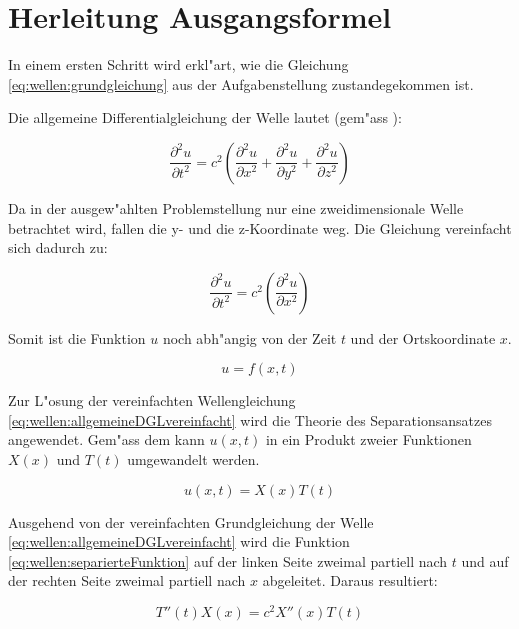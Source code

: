 \section{Herleitung Ausgangsformel}
In einem ersten Schritt wird erkl"art, wie die 
Gleichung \ref{eq:wellen:grundgleichung} aus der Aufgabenstellung 
zustandegekommen 
ist.

Die allgemeine Differentialgleichung der Welle lautet (gem"ass 
\cite{wellen:smirnow2}):

\begin{equation*}
	\frac{\partial^2 u}{\partial t^2}
	=
	c^2
	\left(
		\frac{\partial^2 u}{\partial x^2} 
		+ \frac{\partial^2 u}{\partial y^2} 
		+ \frac{\partial^2 u}{\partial z^2}
	\right)
	\label{eq:wellen:allgemeineDGL}
\end{equation*}

Da in der ausgew"ahlten Problemstellung nur eine zweidimensionale Welle 
betrachtet wird, fallen die y- und die z-Koordinate weg. Die Gleichung 
vereinfacht sich dadurch zu:

\begin{equation}
	\frac{\partial^2 u}{\partial t^2}
	=
	c^2
	\left(
		\frac{\partial^2 u}{\partial x^2} 
	\right)
	\label{eq:wellen:allgemeineDGLvereinfacht}
\end{equation}

Somit ist die Funktion $u$ noch abh"angig von der Zeit $t$ und der 
Ortskoordinate 
$x$.

\begin{equation*}
	u = f(x,t)
\end{equation*}

Zur L"osung der vereinfachten Wellengleichung 
\ref{eq:wellen:allgemeineDGLvereinfacht} wird die Theorie des 
Separationsansatzes 
angewendet. Gem"ass dem kann $u(x, t)$ in ein Produkt zweier Funktionen $X(x)$ 
und $T(t)$ umgewandelt werden.

\begin{equation}
	u (x,t) = X(x) T(t)
	\label{eq:wellen:separierteFunktion}
\end{equation}

Ausgehend von der vereinfachten Grundgleichung der Welle 
\ref{eq:wellen:allgemeineDGLvereinfacht} wird die Funktion 
\ref{eq:wellen:separierteFunktion} auf der linken Seite zweimal partiell nach 
$t$ 
und auf der rechten Seite zweimal partiell nach $x$ abgeleitet. Daraus 
resultiert:

\begin{equation}
	T''(t) X(x) = c^2 X''(x)T(t)
\end{equation}

